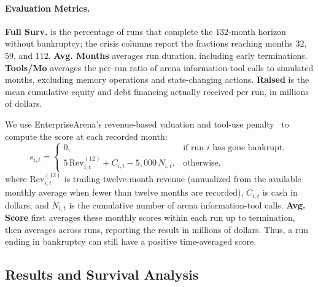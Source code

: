 \paragraph{Evaluation Metrics.}
\textbf{Full Surv.} is the percentage of runs that complete the $132$-month horizon without bankruptcy; the crisis columns report the fractions reaching months $32$, $59$, and $112$. \textbf{Avg. Months} averages run duration, including early terminations. \textbf{Tools/Mo} averages the per-run ratio of arena information-tool calls to simulated months, excluding memory operations and state-changing actions. \textbf{Raised} is the mean cumulative equity and debt financing actually received per run, in millions of dollars.

We use EnterpriseArena's revenue-based valuation and tool-use penalty~\citep{han2026can} to compute the score at each recorded month:
\begin{equation}
    s_{i,t} =
    \begin{cases}
        0, & \text{if run } i \text{ has gone bankrupt}, \\
        5\,\mathrm{Rev}^{(12)}_{i,t} + C_{i,t} - 5{,}000\,N_{i,t}, & \text{otherwise},
    \end{cases}
    \label{eq:enterprise_score}
\end{equation}
where $\mathrm{Rev}^{(12)}_{i,t}$ is trailing-twelve-month revenue (annualized from the available monthly average when fewer than twelve months are recorded), $C_{i,t}$ is cash in dollars, and $N_{i,t}$ is the cumulative number of arena information-tool calls. \textbf{Avg. Score} first averages these monthly scores within each run up to termination, then averages across runs, reporting the result in millions of dollars. Thus, a run ending in bankruptcy can still have a positive time-averaged score.

\subsection{Results and Survival Analysis}
\label{app:cfo_plots}

